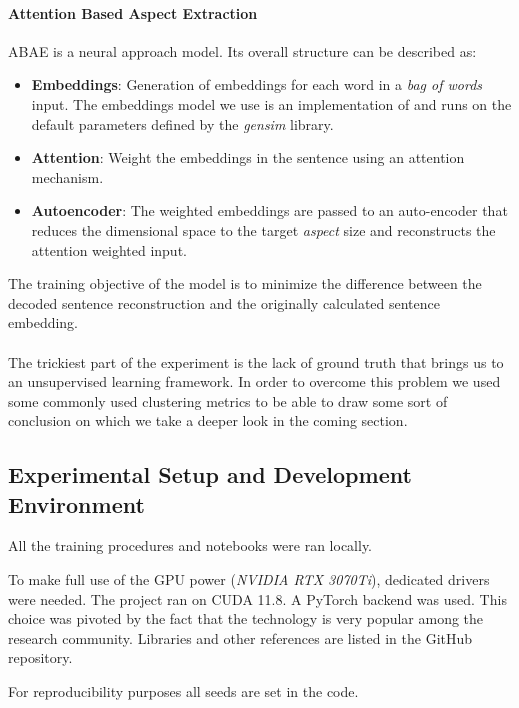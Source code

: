 \paragraph{Attention Based Aspect Extraction}
ABAE is a neural approach model. Its overall structure can be described as:
\begin{itemize}
    \item {\textbf{Embeddings}}: Generation of embeddings for each word in a \textit{bag of words} input.
    The embeddings model we use is an implementation of  and runs on the default parameters defined by the \textit{gensim} library.
    \item {\textbf{Attention}}: Weight the embeddings in the sentence using an attention mechanism.
    \item {\textbf{Autoencoder}}: The weighted embeddings are passed to an auto-encoder that reduces the dimensional
    space to the target \textit{aspect} size and reconstructs the attention weighted input.
\end{itemize}

The training objective of the model is to minimize the difference between the decoded sentence reconstruction
and the originally calculated sentence embedding.

\paragraph{}
The trickiest part of the experiment is the lack of ground truth that brings us to an unsupervised learning framework.
In order to overcome this problem we used some commonly used clustering metrics to be able to draw some sort of conclusion on which we
take a deeper look in the coming section.

\subsection{Experimental Setup and Development Environment}
All the training procedures and notebooks were ran locally.

To make full use of the GPU power (\textit{NVIDIA RTX 3070Ti}), dedicated drivers were needed.
The project ran on CUDA 11.8.
A PyTorch backend was used.
This choice was pivoted by the fact that the technology is very popular among the research community.
Libraries and other references are listed in the GitHub repository\cite{Fichera_Muffin_vs_Chihuahua_2024}.

For reproducibility purposes all seeds are set in the code.


